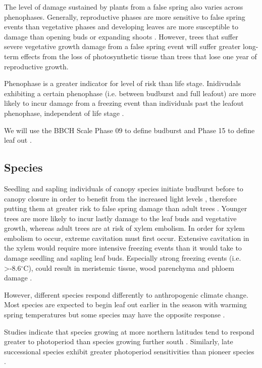 \documentclass{article}\usepackage[]{graphicx}\usepackage[]{color}
\begin{document}
The level of damage sustained by plants from a false spring also varies across phenophases. Generally, reproductive phases are more sensitive to false spring events than vegetative phases and developing leaves are more susceptible to damage than opening buds or expanding shoots \citep{Lenz2013,Augspurger2009}. However, trees that suffer severe vegetative growth damage from a false spring event will suffer greater long-term effects from the loss of photosynthetic tissue than trees that lose one year of reproductive growth.

Phenophase is a greater indicator for level of risk than life stage. Inidivudals exhibiting a certain phenophase (i.e. between budburst and full leafout) are more likely to incur damage from a freezing event than individuals past the leafout phenophase, independent of life stage \citep{Augspurger2009,Vitasse2014}.

We will use the BBCH Scale Phase 09 to define budburst and Phase 15 to define leaf out \citep{Meier2001}.


\subsection*{Species}
Seedling and sapling individuals of canopy species initiate budburst before to canopy closure in order to benefit from the increased light levels \citep{Augspurger2008}, therefore putting them at greater risk to false spring damage than adult trees \citep{Vitasse2014}. Younger trees are more likely to incur lastly damage to the leaf buds and vegetative growth, whereas adult trees are at risk of xylem embolism. In order for xylem embolism to occur, extreme cavitation must first occur. Extensive cavitation in the xylem would require more intensive freezing events than it would take to damage seedling and sapling leaf buds. Especially strong freezing events (i.e. >-8.6$^{\circ}$C), could result in meristemic tissue, wood parenchyma and phloem damage \citep{Lenz2013, Augspurger2011, Sakai1987}.  

However, different species respond differently to anthropogenic climate change. Most species are expected to begin leaf out earlier in the season with warming spring temperatures but some species may have the opposite response \citep{Xin2016, Cleland2006, Yu2010}.

Studies indicate that species growing at more northern latitudes tend to respond greater to photoperiod than species growing further south \citep{Caffarra2011}. Similarly, late successional species exhibit greater photoperiod sensitivities than pioneer species \citep{Basler2012}. 
\end{document}
